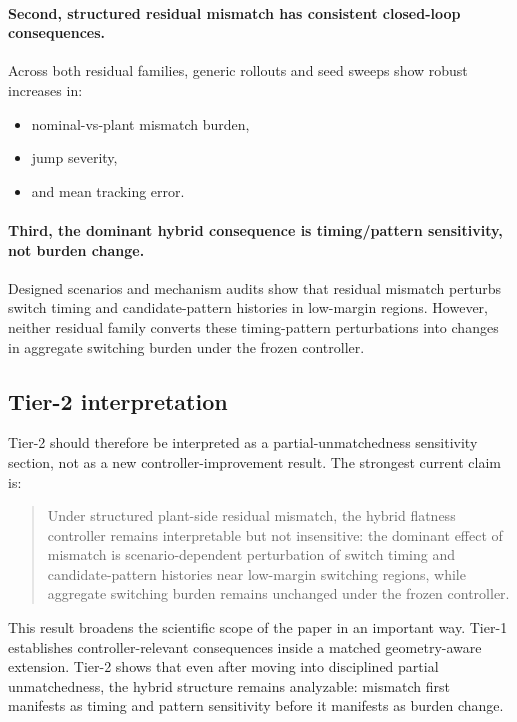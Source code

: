 \paragraph{Second, structured residual mismatch has consistent closed-loop consequences.}
Across both residual families, generic rollouts and seed sweeps show robust increases in:
\begin{itemize}
    \item nominal-vs-plant mismatch burden,
    \item jump severity,
    \item and mean tracking error.
\end{itemize}

\paragraph{Third, the dominant hybrid consequence is timing/pattern sensitivity, not burden change.}
Designed scenarios and mechanism audits show that residual mismatch perturbs switch timing and candidate-pattern histories in low-margin regions. However, neither residual family converts these timing-pattern perturbations into changes in aggregate switching burden under the frozen controller.

\subsection{Tier-2 interpretation}
\label{subsec:tier2_interpretation}

Tier-2 should therefore be interpreted as a partial-unmatchedness sensitivity section, not as a new controller-improvement result. The strongest current claim is:

\begin{quote}
Under structured plant-side residual mismatch, the hybrid flatness controller remains interpretable but not insensitive: the dominant effect of mismatch is scenario-dependent perturbation of switch timing and candidate-pattern histories near low-margin switching regions, while aggregate switching burden remains unchanged under the frozen controller.
\end{quote}

This result broadens the scientific scope of the paper in an important way. Tier-1 establishes controller-relevant consequences inside a matched geometry-aware extension. Tier-2 shows that even after moving into disciplined partial unmatchedness, the hybrid structure remains analyzable: mismatch first manifests as timing and pattern sensitivity before it manifests as burden change.

